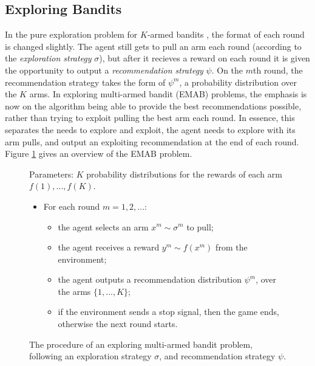     \subsection{Exploring Bandits}
    \label{sec:2-1-1-exploring-mab}

        In the pure exploration problem for $K$-armed bandits \cite{exploring_bandit}, the format of each round is changed slightly. The agent still gets to pull an arm each round (according to the \textit{exploration strategy} $\sigma$), but after it recieves a reward on each round it is given the opportunity to output a \textit{recommendation strategy} $\psi$. On the $m$th round, the recommendation strategy takes the form of $\psi^m$, a probability distribution over the $K$ arms. In exploring multi-armed bandit (EMAB) problems, the emphasis is now on the algorithm being able to provide the best recommendations possible, rather than trying to exploit pulling the best arm each round. In essence, this separates the needs to explore and exploit, the agent needs to explore with its arm pulls, and output an exploiting recommendation at the end of each round. Figure \ref{fig:2:emab_problem} gives an overview of the EMAB problem. 

        \begin{figure}
            \begin{tcolorbox}
                Parameters: $K$ probability distributions for the rewards of each arm $f(1),...,f(K)$.
                \begin{itemize}
                    \item For each round $m=1,2,...$:
                    \begin{itemize}
                        \item the agent selects an arm $x^m\sim\sigma^m$ to pull;
                        \item the agent receives a reward $y^m \sim f(x^m)$ from the environment;
                        \item the agent outputs a recommendation distribution $\psi^m$, over the arms $\{1,...,K\}$;
                        \item if the environment sends a stop signal, then the game ends, otherwise the next round starts.
                    \end{itemize} 
                \end{itemize}
            \end{tcolorbox}
            \caption{The procedure of an exploring multi-armed bandit problem, following an exploration strategy $\sigma$, and recommendation strategy $\psi$.}
            \label{fig:2:emab_problem}
        \end{figure}

